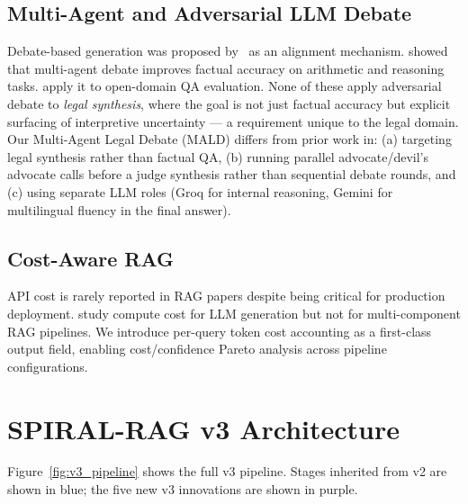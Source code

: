 \documentclass[12pt,a4paper]{article}
\begin{document}
\subsection{Multi-Agent and Adversarial LLM Debate}

Debate-based generation was proposed by~\citet{irving2018debate} as an alignment
mechanism. \citet{du2023improving} showed that multi-agent debate improves factual
accuracy on arithmetic and reasoning tasks. \citet{chan2023chateval} apply it to
open-domain QA evaluation. None of these apply adversarial debate to \emph{legal
synthesis}, where the goal is not just factual accuracy but explicit surfacing
of interpretive uncertainty — a requirement unique to the legal domain. Our
Multi-Agent Legal Debate (MALD) differs from prior work in: (a) targeting legal
synthesis rather than factual QA, (b) running parallel advocate/devil's advocate
calls before a judge synthesis rather than sequential debate rounds, and
(c) using separate LLM roles (Groq for internal reasoning, Gemini for multilingual
fluency in the final answer).

\subsection{Cost-Aware RAG}

API cost is rarely reported in RAG papers despite being critical for production
deployment. \citet{yue2024inference} study compute cost for LLM generation but not
for multi-component RAG pipelines. We introduce per-query token cost accounting
as a first-class output field, enabling cost/confidence Pareto analysis across
pipeline configurations.

\section{SPIRAL-RAG v3 Architecture}
\label{sec:architecture}

Figure~\ref{fig:v3_pipeline} shows the full v3 pipeline. Stages inherited from v2
are shown in blue; the five new v3 innovations are shown in purple.
\end{document}
